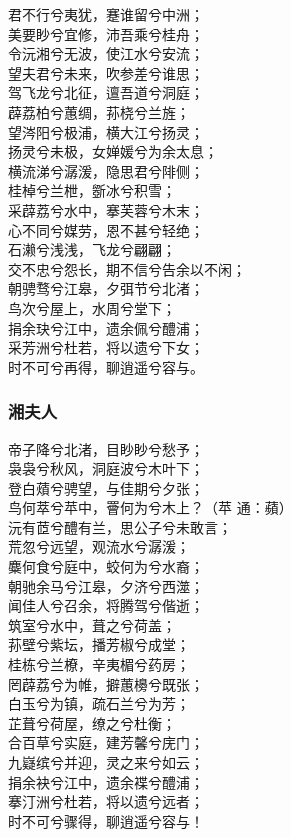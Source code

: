 \documentclass[]{article}
\begin{document}
君不行兮夷犹，蹇谁留兮中洲；\\
美要眇兮宜修，沛吾乘兮桂舟；\\
令沅湘兮无波，使江水兮安流；\\
望夫君兮未来，吹参差兮谁思；\\
驾飞龙兮北征，邅吾道兮洞庭；\\
薜荔柏兮蕙绸，荪桡兮兰旌；\\
望涔阳兮极浦，横大江兮扬灵；\\
扬灵兮未极，女婵媛兮为余太息；\\
横流涕兮潺湲，隐思君兮陫侧；\\
桂棹兮兰枻，斵冰兮积雪；\\
采薜荔兮水中，搴芙蓉兮木末；\\
心不同兮媒劳，恩不甚兮轻绝；\\
石濑兮浅浅，飞龙兮翩翩；\\
交不忠兮怨长，期不信兮告余以不闲；\\
朝骋骛兮江皋，夕弭节兮北渚；\\
鸟次兮屋上，水周兮堂下；\\
捐余玦兮江中，遗余佩兮醴浦；\\
采芳洲兮杜若，将以遗兮下女；\\
时不可兮再得，聊逍遥兮容与。

\hypertarget{header-n31}{%
\subsubsection{湘夫人}\label{header-n31}}

帝子降兮北渚，目眇眇兮愁予；\\
袅袅兮秋风，洞庭波兮木叶下；\\
登白薠兮骋望，与佳期兮夕张；\\
鸟何萃兮苹中，罾何为兮木上？（苹 通：蘋）\\
沅有茝兮醴有兰，思公子兮未敢言；\\
荒忽兮远望，观流水兮潺湲；\\
麋何食兮庭中，蛟何为兮水裔；\\
朝驰余马兮江皋，夕济兮西澨；\\
闻佳人兮召余，将腾驾兮偕逝；\\
筑室兮水中，葺之兮荷盖；\\
荪壁兮紫坛，播芳椒兮成堂；\\
桂栋兮兰橑，辛夷楣兮药房；\\
罔薜荔兮为帷，擗蕙櫋兮既张；\\
白玉兮为镇，疏石兰兮为芳；\\
芷葺兮荷屋，缭之兮杜衡；\\
合百草兮实庭，建芳馨兮庑门；\\
九嶷缤兮并迎，灵之来兮如云；\\
捐余袂兮江中，遗余褋兮醴浦；\\
搴汀洲兮杜若，将以遗兮远者；\\
时不可兮骤得，聊逍遥兮容与！
\end{document}

